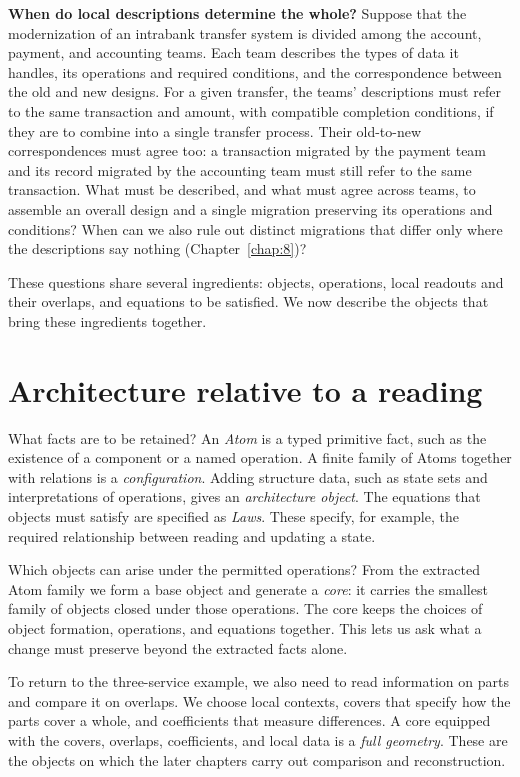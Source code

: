 \textbf{When do local descriptions determine the whole?}
Suppose that the modernization of an intrabank transfer system is divided
among the account, payment, and accounting teams. Each team describes the
types of data it handles, its operations and required conditions, and the
correspondence between the old and new designs. For a given transfer, the
teams' descriptions must refer to the same transaction and amount, with
compatible completion conditions, if they are to combine into a single
transfer process. Their old-to-new correspondences must agree too: a
transaction migrated by the payment team and its record migrated by the
accounting team must still refer to the same transaction. What must be
described, and what must agree across teams, to assemble an overall design
and a single migration preserving its operations and conditions? When can
we also rule out distinct migrations that differ only where the descriptions
say nothing (Chapter~\ref{chap:8})?

These questions share several ingredients: objects, operations, local readouts
and their overlaps, and equations to be satisfied. We now describe the objects
that bring these ingredients together.

\section*{Architecture relative to a reading}

What facts are to be retained? An \emph{Atom} is a typed primitive fact, such
as the existence of a component or a named operation. A finite family of
Atoms together with relations is a \emph{configuration}. Adding structure
data, such as state sets and interpretations of operations, gives an
\emph{architecture object}. The equations that objects must satisfy are
specified as \emph{Laws}. These specify, for example, the required relationship
between reading and updating a state.

Which objects can arise under the permitted operations? From the extracted
Atom family we form a base object and generate a \emph{core}: it carries
the smallest family of objects closed under those operations. The core keeps
the choices of object formation, operations, and equations together. This
lets us ask what a change must preserve beyond the extracted facts alone.

To return to the three-service example, we also need to read information on
parts and compare it on overlaps. We choose local contexts, covers that
specify how the parts cover a whole, and coefficients that measure differences.
A core equipped with the covers, overlaps, coefficients, and local data is a
\emph{full geometry}. These are the objects on which the later chapters carry
out comparison and reconstruction.

